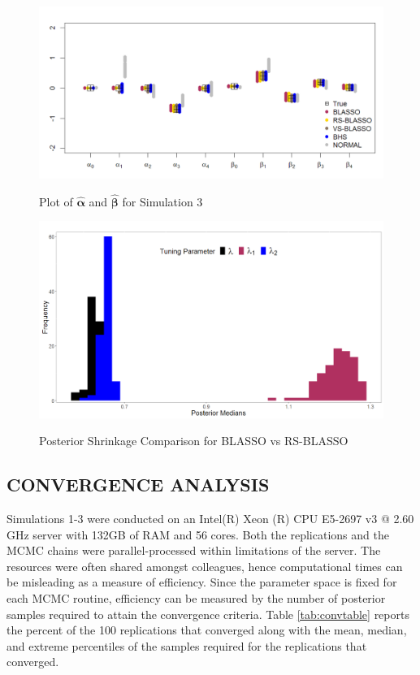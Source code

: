 \begin{figure}[!h]
	\centering
	      \caption{Plot of $\hat{\bm{\alpha}}$ and $\hat{\bm{\beta}}$ for Simulation 3}
      \includegraphics[scale=0.35]{blassovsbhs4}
      \label{fig:blvsbh4}
\end{figure}

\begin{figure}[!h]
	\centering
	      \caption{Posterior Shrinkage Comparison for BLASSO vs RS-BLASSO}
      \includegraphics[scale=0.30]{rslambda}
      \label{fig:lambdabox}
\end{figure}

\vskip 3mm

\subsection{CONVERGENCE ANALYSIS}

Simulations 1-3 were conducted on an Intel(R) Xeon (R) CPU E5-2697 v3 @ 2.60 GHz server with 132GB of RAM and 56 cores. Both the replications and the MCMC chains were parallel-processed within limitations of the server. The resources were often shared amongst colleagues, hence computational times can be misleading as a measure of efficiency. Since the parameter space is fixed for each MCMC routine, efficiency can be measured by the number of posterior samples required to attain the convergence criteria. Table \ref{tab:convtable} reports the percent of the 100 replications that converged along with the mean, median, and extreme percentiles of the samples required for the replications that converged.

